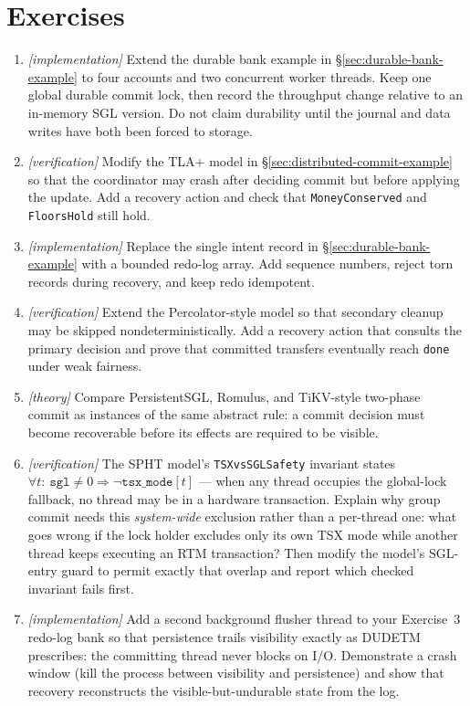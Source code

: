 \section{Exercises}
\begin{enumerate}
    \item \emph{[implementation]} Extend the durable bank example in \S\ref{sec:durable-bank-example} to four accounts and two concurrent worker threads. Keep one global durable commit lock, then record the throughput change relative to an in-memory SGL version. Do not claim durability until the journal and data writes have both been forced to storage.
    \item \emph{[verification]} Modify the TLA+ model in \S\ref{sec:distributed-commit-example} so that the coordinator may crash after deciding commit but before applying the update. Add a recovery action and check that \texttt{MoneyConserved} and \texttt{FloorsHold} still hold.
    \item \emph{[implementation]} Replace the single intent record in \S\ref{sec:durable-bank-example} with a bounded redo-log array. Add sequence numbers, reject torn records during recovery, and keep redo idempotent.
    \item \emph{[verification]} Extend the Percolator-style model so that secondary cleanup may be skipped nondeterministically. Add a recovery action that consults the primary decision and prove that committed transfers eventually reach \texttt{done} under weak fairness.
    \item \emph{[theory]} Compare PersistentSGL, Romulus, and TiKV-style two-phase commit as instances of the same abstract rule: a commit decision must become recoverable before its effects are required to be visible.
    \item \emph{[verification]} The SPHT model's \texttt{TSXvsSGLSafety} invariant states $\forall t:\ \texttt{sgl} \neq 0 \Rightarrow \lnot\texttt{tsx\_mode}[t]$ --- when any thread occupies the global-lock fallback, no thread may be in a hardware transaction. Explain why group commit needs this \emph{system-wide} exclusion rather than a per-thread one: what goes wrong if the lock holder excludes only its own TSX mode while another thread keeps executing an RTM transaction? Then modify the model's SGL-entry guard to permit exactly that overlap and report which checked invariant fails first.
    \item \emph{[implementation]} Add a second background flusher thread to your Exercise~3 redo-log bank so that persistence trails visibility exactly as DUDETM prescribes: the committing thread never blocks on I/O. Demonstrate a crash window (kill the process between visibility and persistence) and show that recovery reconstructs the visible-but-undurable state from the log.

\end{enumerate}
